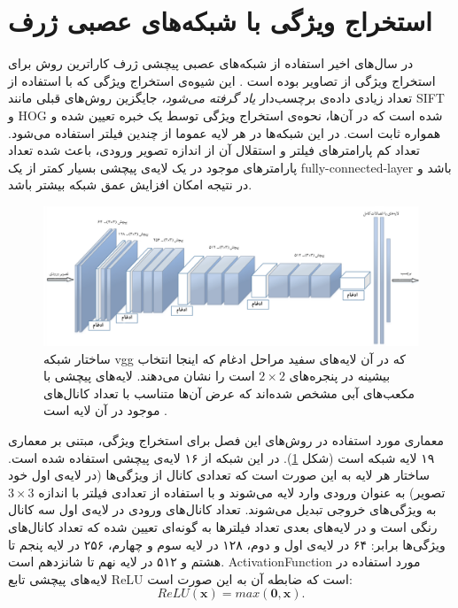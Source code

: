 \section{استخراج ویژگی با شبکه‌های عصبی ژرف}\label{cnns}
 در سال‌های اخیر استفاده از شبکه‌های عصبی پیچشی ژرف کاراترین روش برای استخراج ویژگی از تصاویر بوده است \cite{Oquab2014}. این شیوه‌ی استخراج ویژگی که با استفاده از تعداد زیادی داده‌ی برچسب‌دار
\textit{یاد گرفته می‌شود،}
جایگزین روش‌های قبلی مانند SIFT و HOG شده است که در آن‌ها، نحوه‌ی استخراج ویژگی توسط یک خبره تعیین شده و همواره ثابت است.
 در این شبکه‌ها در هر لایه عموما از چندین فیلتر استفاده می‌شود. تعداد کم پارامترهای فیلتر و استقلال آن از اندازه تصویر ورودی، باعث شده تعداد پارامتر‌های موجود در یک لایه‌ی پیچشی بسیار کمتر از یک \gls{fully-connected-layer} باشد و در نتیجه امکان افزایش عمق شبکه بیشتر باشد.
\begin{figure}[!t]
\centering
\includegraphics[width=1.1\linewidth]{images/vgg}
\caption[ساختار شبکه استخراج ویژگی]{
ساختار شبکه vgg که در آن لایه‌های سفید مراحل ادغام که اینجا انتخاب بیشینه در پنجره‌های $2 \times 2$ است را نشان می‌دهند.
لایه‌های پیچشی با مکعب‌های آبی مشخص شده‌اند که عرض آن‌ها متناسب با تعداد کانال‌های موجود در آن لایه است \cite{el2016face}.
}
\label{fig:vgg}
\end{figure}
معماری مورد استفاده در روش‌های این فصل برای استخراج ویژگی، مبتنی بر معماری ۱۹ لایه شبکه  \cite{vgg} است (شکل \ref{fig:vgg}). در این شبکه از ۱۶ لایه‌ی پیچشی استفاده شده است. ساختار هر لایه به این صورت است که تعدادی کانال از ویژگی‌ها (در لایه‌ی اول  خود تصویر) به عنوان ورودی وارد لایه می‌شوند و با استفاده از تعدادی فیلتر با اندازه $3 \times 3$ به ویژگی‌های خروجی تبدیل می‌شوند. تعداد کانال‌های ورودی در لایه‌ی اول سه کانال رنگی  است و در لایه‌های بعدی تعداد فیلتر‌ها به گونه‌ای تعیین شده که تعداد کانال‌های ویژگی‌ها برابر: ۶۴ در لایه‌ی اول و دوم، ۱۲۸ در لایه‌ سوم و چهارم، ۲۵۶ در لایه پنجم تا هشتم و ۵۱۲ در لایه نهم تا شانزدهم است. \gls{ActivationFunction} مورد استفاده در لایه‌های پیچشی تابع \gls{ReLU} است که ضابطه آن به این صورت است:
\begin{equation}
ReLU(\mathbf{x}) = max(\mathbf{0,x}).
\end{equation}
